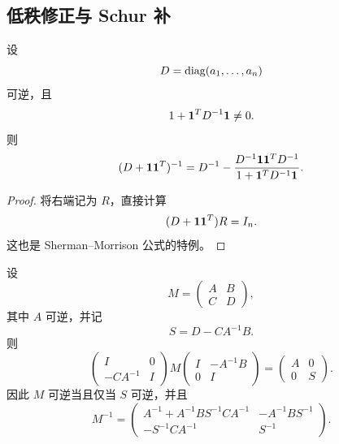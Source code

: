 \subsection{低秩修正与 Schur 补}

\begin{theorem}[对角矩阵加秩一矩阵]
设
\begin{equation}
 D=\operatorname{diag}(a_1,\ldots,a_n)
\end{equation}
可逆，且
\begin{equation}
 1+\bm 1^TD^{-1}\bm 1\neq0.
\end{equation}
则
\begin{equation}
 (D+\bm 1\bm 1^T)^{-1}
 =D^{-1}-
 \frac{D^{-1}\bm 1\bm 1^TD^{-1}}
 {1+\bm 1^TD^{-1}\bm 1}.
\end{equation}
\end{theorem}

\begin{proof}
将右端记为 $R$，直接计算
\begin{equation}
 (D+\bm 1\bm 1^T)R=I_n.
\end{equation}
这也是 Sherman--Morrison 公式的特例。
\end{proof}

\begin{theorem}
设
\begin{equation}
 M=\begin{pmatrix}A&B\\ C&D\end{pmatrix},
\end{equation}
其中 $A$ 可逆，并记
\begin{equation}
 S=D-CA^{-1}B.
\end{equation}
则
\begin{equation}
 \begin{pmatrix}I&0\\-CA^{-1}&I\end{pmatrix}
 M
 \begin{pmatrix}I&-A^{-1}B\\0&I\end{pmatrix}
 =\begin{pmatrix}A&0\\0&S\end{pmatrix}.
\end{equation}
因此 $M$ 可逆当且仅当 $S$ 可逆，并且
\begin{equation}
 M^{-1}=
 \begin{pmatrix}
 A^{-1}+A^{-1}BS^{-1}CA^{-1}&-A^{-1}BS^{-1}\\
 -S^{-1}CA^{-1}&S^{-1}
 \end{pmatrix}.
\end{equation}
\end{theorem}

